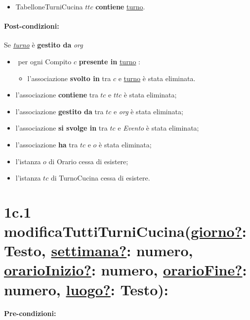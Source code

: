 \begin{itemize}
  \item TabelloneTurniCucina $ttc$ \textbf{contiene} \underline{turno}.
\end{itemize}

\paragraph{Post-condizioni:} Se \underline{\textit{turno}} è \textbf{gestito da} {\textit{org}}

\begin{itemize}
   \item \textlangle $ $ per ogni Compito $c$ \textbf{presente in} \underline{turno} \textrangle:
    \begin{itemize}
        \item l'associazione \textbf{svolto in} tra $c$ e \underline{turno} è stata eliminata.
    \end{itemize}
    \item l'associazione \textbf{contiene} tra $tc$ e $ttc$ è stata eliminata;
    \item l'associazione \textbf{gestito da} tra $tc$ e \textit{org} è stata eliminata;
\item l'associazione \textbf{si svolge in} tra $tc$ e \textit{Evento} è stata eliminata;
    \item l'associazione \textbf{ha} tra $tc$ e $o$ è stata eliminata;
    \item l'istanza $o$ di Orario cessa di esistere;
    \item l'istanza $tc$ di TurnoCucina cessa di esistere.
\end{itemize}

\section*{1c.1 modificaTuttiTurniCucina(\underline{giorno?}: Testo, \underline{settimana?}: numero, \underline{orarioInizio?}: numero, \underline{orarioFine?}: numero, \underline{luogo?}: Testo):}

\paragraph{Pre-condizioni:}

